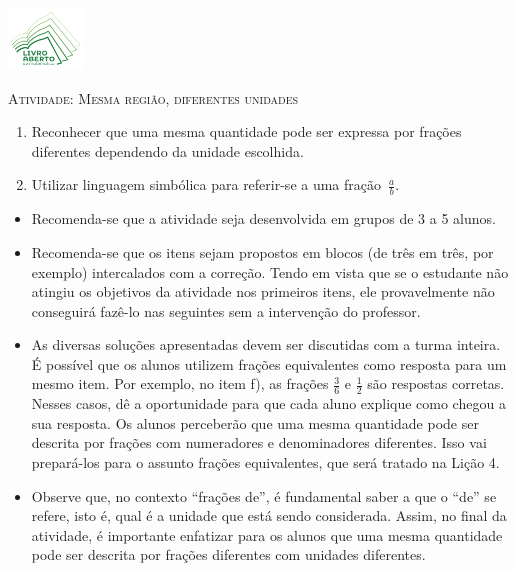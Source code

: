 \documentclass[10 pt,usenames,dvipsnames, oneside]{article}
\begin{document}
\begin{center}
  \begin{minipage}[l]{3cm}
\includegraphics[width=2cm]{logo}    
\end{minipage}\hfill
\begin{minipage}[r]{.8\textwidth}
 {\Large \scshape Atividade: Mesma região, diferentes unidades}  
\end{minipage}
\end{center}
\vspace{.2cm}

\ifdefined\prof
\begin{goals}
\begin{enumerate}

    \item Reconhecer que uma mesma quantidade pode ser expressa por frações diferentes dependendo da unidade escolhida.
    \item Utilizar linguagem simbólica para referir-se a uma fração~$\frac{a}{b}$.

\end{enumerate}
\tcblower

  \begin{itemize} %
  \item Recomenda-se que a atividade seja desenvolvida em grupos de 3 a 5 alunos.
    \item Recomenda-se que os itens sejam propostos em blocos (de três em três, por exemplo) intercalados com a correção. Tendo em vista que se o estudante não atingiu os objetivos da atividade nos primeiros itens, ele provavelmente não conseguirá fazê-lo nas seguintes sem a intervenção do professor.
    \item As diversas soluções apresentadas devem ser discutidas com a
turma inteira. É possível que os alunos utilizem frações equivalentes como
resposta para um mesmo item. Por exemplo, no item f), as frações $\frac{3}{6}$ e $\frac{1}{2}$ são respostas corretas. Nesses casos, dê a oportunidade para que cada aluno explique como chegou a sua resposta. Os alunos perceberão que uma mesma quantidade pode ser descrita por frações com numeradores e denominadores diferentes. Isso vai prepará-los para o assunto frações equivalentes, que será tratado na Lição 4.
    \item Observe que, no contexto ``frações de'', é fundamental saber a que o ``de'' se refere, isto é, qual é a unidade que está sendo considerada. Assim, no final da atividade, é importante enfatizar para os alunos que uma mesma quantidade pode ser descrita por frações diferentes com unidades diferentes.
\end{itemize} %

\end{goals}
\end{document}
